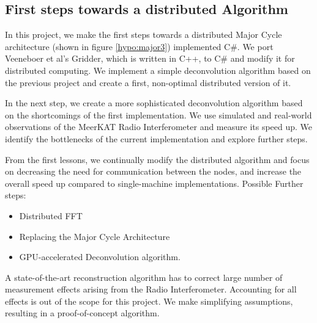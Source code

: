 \documentclass[11pt]{article}
\numberwithin{equation}{section}
\begin{document}
\subsection*{First steps towards a distributed Algorithm}
In this project, we make the first steps towards a distributed Major Cycle architecture (shown in figure \ref{hypo:major3}) implemented C\#. We port Veeneboer et al's Gridder, which is written in C++, to C\# and modify it for distributed computing. We implement a simple deconvolution algorithm based on the previous project and create a first, non-optimal distributed version of it.

In the next step, we create a more sophisticated deconvolution algorithm based on the shortcomings of the first implementation. We use simulated and real-world observations of the MeerKAT Radio Interferometer and measure its speed up. We identify the bottlenecks of the current implementation and explore further steps.

From the first lessons, we continually modify the distributed algorithm and focus on decreasing the need for communication between the nodes, and increase the overall speed up compared to single-machine implementations. Possible Further steps:
\begin{itemize}
	\item Distributed FFT
	\item Replacing the Major Cycle Architecture
	\item GPU-accelerated Deconvolution algorithm.
\end{itemize}

A state-of-the-art reconstruction algorithm has to correct large number of measurement effects arising from the Radio Interferometer. Accounting for all effects is out of the scope for this project. We make simplifying assumptions, resulting in a proof-of-concept algorithm.

\newpage
{}
%

\end{document}
